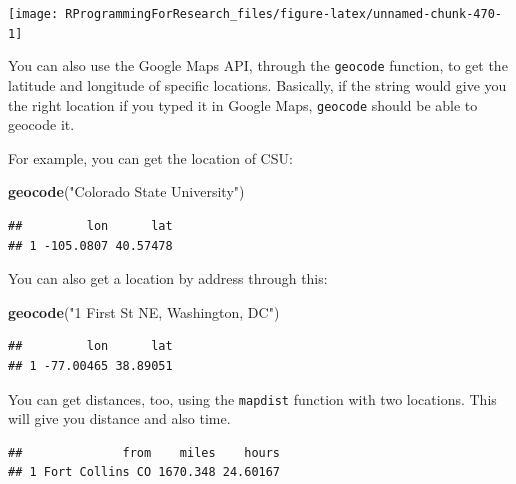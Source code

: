 \documentclass[]{book}
\makeatletter
\newenvironment{Shaded}{\begin{snugshade}}{\end{snugshade}}
\newcommand{\KeywordTok}[1]{\textcolor[rgb]{0.13,0.29,0.53}{\textbf{{#1}}}}
\newcommand{\StringTok}[1]{\textcolor[rgb]{0.31,0.60,0.02}{{#1}}}
\newcommand{\NormalTok}[1]{{#1}}
\newenvironment{kframe}{%
\medskip{}
\setlength{\fboxsep}{.8em}
 \def\at@end@of@kframe{}%
 \ifinner\ifhmode%
  \def\at@end@of@kframe{\end{minipage}}%
  \begin{minipage}{\columnwidth}%
 \fi\fi%
 \def\FrameCommand##1{\hskip\@totalleftmargin \hskip-\fboxsep
 \colorbox{shadecolor}{##1}\hskip-\fboxsep
     \hskip-\linewidth \hskip-\@totalleftmargin \hskip\columnwidth}%
 \MakeFramed {\advance\hsize-\width
   \@totalleftmargin\z@ \linewidth\hsize
   \@setminipage}}%
 {\par\unskip\endMakeFramed%
 \at@end@of@kframe}
\renewenvironment{Shaded}{\begin{kframe}}{\end{kframe}}
\makeatother
\begin{document}
\begin{center}\texttt{[image: RProgrammingForResearch\_files/figure-latex/unnamed-chunk-470-1]} \end{center}

You can also use the Google Maps API, through the \texttt{geocode}
function, to get the latitude and longitude of specific locations.
Basically, if the string would give you the right location if you typed
it in Google Maps, \texttt{geocode} should be able to geocode it.

For example, you can get the location of CSU:

\begin{Shaded}
\begin{Highlighting}[]
\KeywordTok{geocode}\NormalTok{(}\StringTok{"Colorado State University"}\NormalTok{)}
\end{Highlighting}
\end{Shaded}

\begin{verbatim}
##         lon      lat
## 1 -105.0807 40.57478
\end{verbatim}

You can also get a location by address through this:

\begin{Shaded}
\begin{Highlighting}[]
\KeywordTok{geocode}\NormalTok{(}\StringTok{"1 First St NE, Washington, DC"}\NormalTok{)}
\end{Highlighting}
\end{Shaded}

\begin{verbatim}
##         lon      lat
## 1 -77.00465 38.89051
\end{verbatim}

You can get distances, too, using the \texttt{mapdist} function with two
locations. This will give you distance and also time.

\begin{Shaded}
\end{Shaded}

\begin{verbatim}
##              from    miles    hours
## 1 Fort Collins CO 1670.348 24.60167
\end{verbatim}
\end{document}
